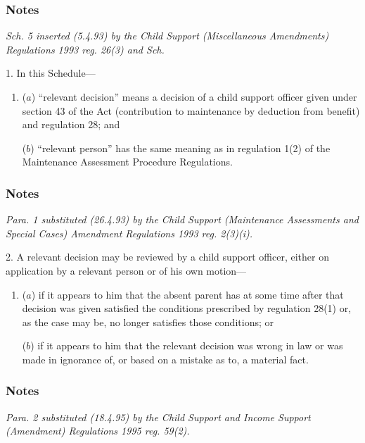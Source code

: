 \documentclass[a4paper]{article}
\newcommand{\parthead}{}
\newcommand\amendment[1]{\subsubsection*{Notes}{\itshape\frenchspacing\footnotesize #1 \par\goodbreak}}
\begin{document}
\renewcommand\parthead{--- Schedule 5}

\amendment{
Sch. 5 inserted (5.4.93) by the Child Support (Miscellaneous Amendments) Regulations 1993 reg. 26(3) and Sch.
}
\medskip

1.  In this Schedule—
\begin{enumerate}\item[]
($a$) “relevant decision” means a decision of a child support officer given under section 43 of the Act (contribution to maintenance by deduction from benefit) and regulation 28; and

($b$) “relevant person” has the same meaning as in regulation 1(2) of the Maintenance Assessment Procedure Regulations.
\end{enumerate}

\amendment{
Para. 1 substituted (26.4.93) by the Child Support (Maintenance Assessments and Special Cases) Amendment Regulations 1993 reg. 2(3)(i).
}

\medskip


2.  A relevant decision may be reviewed by a child support officer, either on application by a relevant person or of his own motion—
\begin{enumerate}\item[]
($a$) if it appears to him that the absent parent has at some time after that decision was given satisfied the conditions prescribed by regulation 28(1) or, as the case may be, no longer satisfies those conditions; or

($b$) if it appears to him that the relevant decision was wrong in law or was made in ignorance of, or based on a mistake as to, a material fact.
\end{enumerate}

\amendment{
Para. 2 substituted (18.4.95) by the Child Support and Income Support (Amendment) Regulations 1995 reg. 59(2).
}
\end{document}
